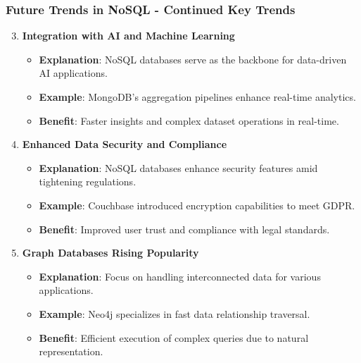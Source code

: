 \documentclass[aspectratio=169]{beamer}
\begin{document}
\begin{frame}[fragile]
    \frametitle{Future Trends in NoSQL - Continued Key Trends}
    \begin{enumerate}
        \setcounter{enumi}{2} %
        \item \textbf{Integration with AI and Machine Learning}  
            \begin{itemize}
                \item \textbf{Explanation}: NoSQL databases serve as the backbone for data-driven AI applications.
                \item \textbf{Example}: MongoDB's aggregation pipelines enhance real-time analytics.
                \item \textbf{Benefit}: Faster insights and complex dataset operations in real-time.
            \end{itemize}
    
        \item \textbf{Enhanced Data Security and Compliance}  
            \begin{itemize}
                \item \textbf{Explanation}: NoSQL databases enhance security features amid tightening regulations.
                \item \textbf{Example}: Couchbase introduced encryption capabilities to meet GDPR.
                \item \textbf{Benefit}: Improved user trust and compliance with legal standards.
            \end{itemize}
    
        \item \textbf{Graph Databases Rising Popularity}  
            \begin{itemize}
                \item \textbf{Explanation}: Focus on handling interconnected data for various applications.
                \item \textbf{Example}: Neo4j specializes in fast data relationship traversal.
                \item \textbf{Benefit}: Efficient execution of complex queries due to natural representation.
            \end{itemize}
    \end{enumerate}
\end{frame}
\end{document}
